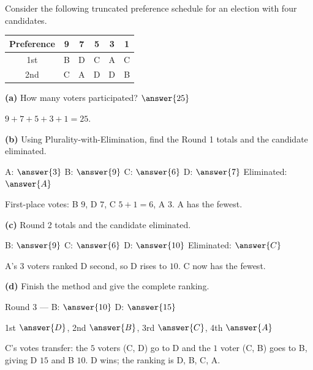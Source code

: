 \documentclass[12pt]{ximera}
\begin{document}
\begin{problem}
Consider the following truncated preference schedule for an election with four
candidates.

\begin{center}
\begin{tabular}{c|ccccc}
Preference & 9 & 7 & 5 & 3 & 1 \\\hline
1st & B & D & C & A & C \\
2nd & C & A & D & D & B
\end{tabular}
\end{center}

\begin{prompt}
\textbf{(a)} How many voters participated? $\answer{25}$

\begin{feedback}
$9+7+5+3+1=25$.
\end{feedback}
\end{prompt}

\begin{prompt}
\textbf{(b)} Using Plurality-with-Elimination, find the Round 1 totals and the candidate
eliminated.

A: $\answer{3}$ \quad B: $\answer{9}$ \quad C: $\answer{6}$ \quad D: $\answer{7}$ \qquad
Eliminated: $\answer{A}$

\begin{feedback}
First-place votes: B $9$, D $7$, C $5+1=6$, A $3$. A has the fewest.
\end{feedback}
\end{prompt}

\begin{prompt}
\textbf{(c)} Round 2 totals and the candidate eliminated.

B: $\answer{9}$ \quad C: $\answer{6}$ \quad D: $\answer{10}$ \qquad Eliminated: $\answer{C}$

\begin{feedback}
A's $3$ voters ranked D second, so D rises to $10$. C now has the fewest.
\end{feedback}
\end{prompt}

\begin{prompt}
\textbf{(d)} Finish the method and give the complete ranking.

Round 3 --- B: $\answer{10}$ \quad D: $\answer{15}$

\smallskip
1st $\answer{D}$, 2nd $\answer{B}$, 3rd $\answer{C}$, 4th $\answer{A}$

\begin{feedback}
C's votes transfer: the $5$ voters (C, D) go to D and the $1$ voter (C, B) goes to B,
giving D $15$ and B $10$. D wins; the ranking is D, B, C, A.
\end{feedback}
\end{prompt}


\end{problem}
\end{document}
